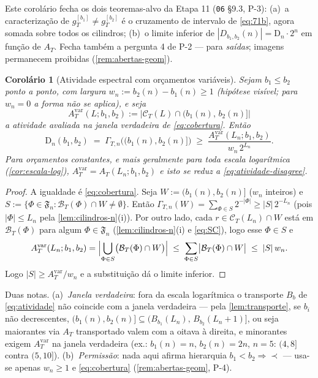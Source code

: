 \documentclass[11pt,a4paper]{article}
\newtheorem{corollary}[theorem]{Corolário}
\theoremstyle{definition}
\theoremstyle{remark}
\begin{document}
\noindent
Este corolário fecha os dois teoremas-alvo da Etapa 11
(\texttt{06} §9.3, P-3): (a)~a caracterização de $g_T^{[b_1]} \neq
g_T^{[b_2]}$ é o cruzamento de intervalo de \eqref{eq:71b}, agora
somada sobre todos os cilindros; (b)~o limite inferior de
$|D_{b_1,b_2}(n)| = \mathrm{D}_n \cdot 2^n$ em função de $A_T$. Fecha
também a pergunta 4 de P-2 --- para \emph{saídas}; imagens permanecem
proibidas (\cref{rem:abertas-geom}).

\begin{corollary}[Atividade espectral com orçamentos variáveis]\label{cor:atividade-var}
Sejam $b_1 \leq b_2$ ponto a ponto, com largura
$w_n := b_2(n) - b_1(n) \geq 1$ (hipótese visível; para $w_n = 0$ a
forma não se aplica), e seja
\begin{equation}\label{eq:atividade-var}
  A^{\mathrm{var}}_T(L; b_1, b_2)
  := \bigl|\mathcal{C}_T(L) \cap (b_1(n),\, b_2(n)]\bigr|
\end{equation}
a atividade avaliada na \emph{janela verdadeira} de \eqref{eq:cobertura}.
Então
\begin{equation}\label{eq:atividade-var-limite}
  \mathrm{D}_n(b_1, b_2)
  \;=\; \Gamma_{T,n}\bigl((b_1(n), b_2(n)]\bigr)
  \;\geq\; \frac{A^{\mathrm{var}}_T(L_n; b_1, b_2)}{w_n \, 2^{L_n}} .
\end{equation}
Para orçamentos constantes, e mais geralmente para toda escala
logarítmica (\cref{cor:escala-log}), $A^{\mathrm{var}}_T = A_T(L_n;
b_1, b_2)$ e isto se reduz a \eqref{eq:atividade-disagree}.
\end{corollary}

\begin{proof}
A igualdade é \eqref{eq:cobertura}. Seja $W := (b_1(n), b_2(n)]$
($w_n$ inteiros) e $S := \{\Phi \in \mathfrak{F}_n : \mathcal{B}_T(\Phi)
\cap W \neq \emptyset\}$. Então
$\Gamma_{T,n}(W) = \sum_{\Phi \in S} 2^{-|\Phi|} \geq |S| \, 2^{-L_n}$
(pois $|\Phi| \leq L_n$ pela \cref{lem:cilindros-n}(i)). Por outro
lado, cada $r \in \mathcal{C}_T(L_n) \cap W$ está em
$\mathcal{B}_T(\Phi)$ para algum $\Phi \in \mathfrak{F}_n$
(\cref{lem:cilindros-n}(i) e \eqref{eq:SC}), logo esse $\Phi \in S$ e
\[
  A^{\mathrm{var}}_T(L_n; b_1, b_2)
  = \Bigl|\bigcup_{\Phi \in S} \bigl(\mathcal{B}_T(\Phi) \cap W\bigr)\Bigr|
  \;\leq\; \sum_{\Phi \in S} \bigl|\mathcal{B}_T(\Phi) \cap W\bigr|
  \;\leq\; |S| \, w_n .
\]
Logo $|S| \geq A^{\mathrm{var}}_T / w_n$ e a substituição dá o limite
inferior.
\end{proof}

\noindent
Duas notas. (a)~\emph{Janela verdadeira}: fora da escala logarítmica o
transporte $B_b$ de \eqref{eq:atividade} não coincide com a janela
verdadeira --- pela \cref{lem:transporte}, se $b_i$ não decrescentes,
$(b_1(n), b_2(n)] \subseteq (B_{b_1}(L_n),\, B_{b_2}(L_n+1)]$, ou seja
maiorantes via $A_T$ transportado valem com a oitava à direita, e
minorantes exigem $A^{\mathrm{var}}_T$ na janela verdadeira
(ex.: $b_1(n) = n$, $b_2(n) = 2n$, $n = 5$: $(4,8]$ contra $(5,10]$).
(b)~\emph{Permissão}: nada aqui afirma hierarquia $b_1 < b_2 \Rightarrow
\prec$ --- usa-se apenas $w_n \geq 1$ e \eqref{eq:cobertura}
(\cref{rem:abertas-geom}, P-4).
\end{document}
